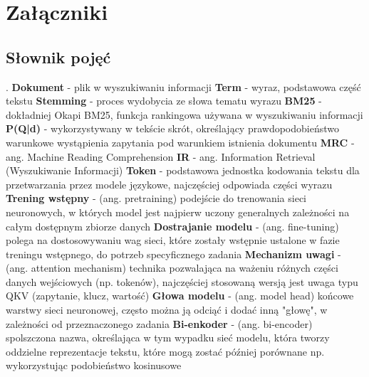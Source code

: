 \chapter*{Załączniki}
\label{chap:zalaczniki}

\section{Słownik pojęć}

.\newline
\textbf{Dokument} - plik w wyszukiwaniu informacji\newline
\textbf{Term} - wyraz, podstawowa część tekstu\newline
\textbf{Stemming} - proces wydobycia ze słowa tematu wyrazu\newline
\textbf{BM25} - dokładniej Okapi BM25, funkcja rankingowa używana w wyszukiwaniu informacji\newline
\textbf{P(Q|d)} - wykorzystywany w tekście skrót, określający prawdopodobieństwo warunkowe wystąpienia zapytania pod warunkiem istnienia dokumentu\newline
\textbf{MRC} - ang. Machine Reading Comprehension\newline
\textbf{IR} - ang. Information Retrieval (Wyszukiwanie Informacji)\newline
\textbf{Token} - podstawowa jednostka kodowania tekstu dla przetwarzania przez modele językowe, najczęściej odpowiada części wyrazu\newline 
\textbf{Trening wstępny} - (ang. pretraining) podejście do trenowania sieci neuronowych, w których model jest najpierw uczony generalnych zależności na całym dostępnym zbiorze danych\newline
\textbf{Dostrajanie modelu} - (ang. fine-tuning) polega na dostosowywaniu wag sieci, które zostały wstępnie ustalone w fazie treningu wstępnego, do potrzeb specyficznego zadania\newline
\textbf{Mechanizm uwagi} - (ang. attention mechanism) technika pozwalająca na ważeniu różnych części danych wejściowych (np. tokenów), najczęściej stosowaną wersją jest uwaga typu QKV (zapytanie, klucz, wartość)\newline
\textbf{Głowa modelu} - (ang. model head) końcowe warstwy sieci neuronowej, często można ją odciąć i dodać inną "głowę", w zależności od przeznaczonego zadania\newline 
\textbf{Bi-enkoder} - (ang. bi-encoder) spolszczona nazwa, określająca w tym wypadku sieć modelu, która tworzy oddzielne reprezentacje tekstu, które mogą zostać później porównane np. wykorzystując podobieństwo kosinusowe
\newline


